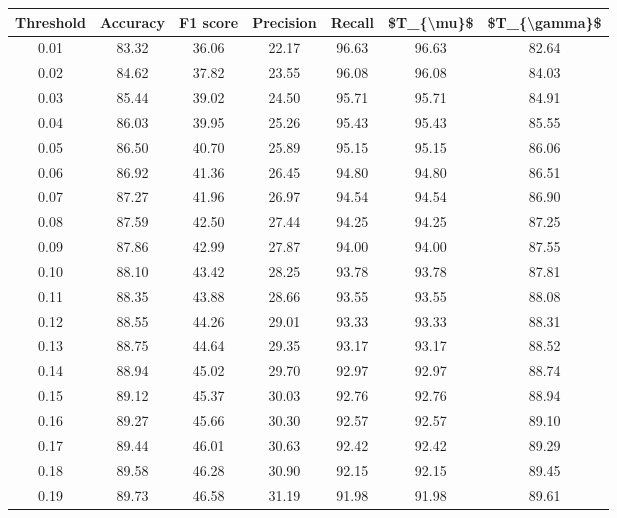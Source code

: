 \begin{tabular}{|c|c|c|c|c|c|c|}
\hline
 Threshold &  Accuracy &  F1 score &  Precision &  Recall &  \$T\_\{\textbackslash mu\}\$ &  \$T\_\{\textbackslash gamma\}\$ \\
\hline
      0.01 &     83.32 &     36.06 &      22.17 &   96.63 &      96.63 &         82.64 \\
      0.02 &     84.62 &     37.82 &      23.55 &   96.08 &      96.08 &         84.03 \\
      0.03 &     85.44 &     39.02 &      24.50 &   95.71 &      95.71 &         84.91 \\
      0.04 &     86.03 &     39.95 &      25.26 &   95.43 &      95.43 &         85.55 \\
      0.05 &     86.50 &     40.70 &      25.89 &   95.15 &      95.15 &         86.06 \\
      0.06 &     86.92 &     41.36 &      26.45 &   94.80 &      94.80 &         86.51 \\
      0.07 &     87.27 &     41.96 &      26.97 &   94.54 &      94.54 &         86.90 \\
      0.08 &     87.59 &     42.50 &      27.44 &   94.25 &      94.25 &         87.25 \\
      0.09 &     87.86 &     42.99 &      27.87 &   94.00 &      94.00 &         87.55 \\
      0.10 &     88.10 &     43.42 &      28.25 &   93.78 &      93.78 &         87.81 \\
      0.11 &     88.35 &     43.88 &      28.66 &   93.55 &      93.55 &         88.08 \\
      0.12 &     88.55 &     44.26 &      29.01 &   93.33 &      93.33 &         88.31 \\
      0.13 &     88.75 &     44.64 &      29.35 &   93.17 &      93.17 &         88.52 \\
      0.14 &     88.94 &     45.02 &      29.70 &   92.97 &      92.97 &         88.74 \\
      0.15 &     89.12 &     45.37 &      30.03 &   92.76 &      92.76 &         88.94 \\
      0.16 &     89.27 &     45.66 &      30.30 &   92.57 &      92.57 &         89.10 \\
      0.17 &     89.44 &     46.01 &      30.63 &   92.42 &      92.42 &         89.29 \\
      0.18 &     89.58 &     46.28 &      30.90 &   92.15 &      92.15 &         89.45 \\
      0.19 &     89.73 &     46.58 &      31.19 &   91.98 &      91.98 &         89.61 \\

\end{tabular}
